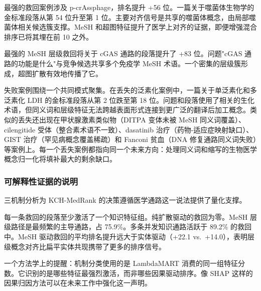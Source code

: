 最强的救回案例涉及 p-crAssphage，排名提升 +56 位。一篇关于噬菌体生物学的金标准段落从第 54 位升至第 1 位。主要对齐信号是共享的噬菌体概念，由局部噬菌体相关候选簇支撑。MeSH 和超图特征提升了医学上对齐的证据，即便增强混合排序已将其埋在前 10 之外。

最强的 MeSH 层级救回将关于 cGAS 通路的段落提升了 +83 位。问题"cGAS 通路的功能是什么"与竞争候选共享多个免疫学 MeSH 术语。一个密集的层级簇形成，超图扩散有效地传播了它。

失败案例围绕一个共同模式聚集。在丢失的泛素化案例中，一篇关于单泛素化和多泛素化 LDH 的金标准段落从第 2 位跌至第 18 位。问题和段落使用了相关的生化术语，但同义词和层级特征无法跨越表面形式连接到更广泛的翻译后加工概念。类似的丢失还出现在甲状腺激素类似物（DITPA 变体未被 MeSH 同义词覆盖）、cilengitide 受体（整合素术语不一致）、dasatinib 治疗（药物-适应症映射缺口）、GIST 治疗（罕见病概念覆盖稀疏）和 Fanconi 贫血（DNA 修复通路同义词失败）等案例上。每一个丢失案例都指向同一个未来方向：处理同义词和缩写的生物医学概念归一化将填补最大的剩余缺口。

\subsubsection{可解释性证据的说明}

三机制分析为 KCH-MedRank 的决策遵循医学通路这一说法提供了量化支撑。

每一条救回的段落至少激活了一个知识特征组。纯扩散驱动的救回为零。MeSH 层级路径是最频繁的主导通路，占 75.9\%。多条并发知识通路活跃于 89.2\% 的救回中。MeSH 驱动救回的平均排名提升远大于实体驱动（+22.1 vs.\ +14.0），表明层级概念对齐比扁平实体共现携带了更多的排序信号。

一个方法学上的提醒：机制分类使用的是 LambdaMART 消费的同一组特征分数。它识别的是哪些特征最强烈激活，而非哪些因果驱动排序。像 SHAP 这样的因果归因方法可以在未来工作中强化这一声明。

